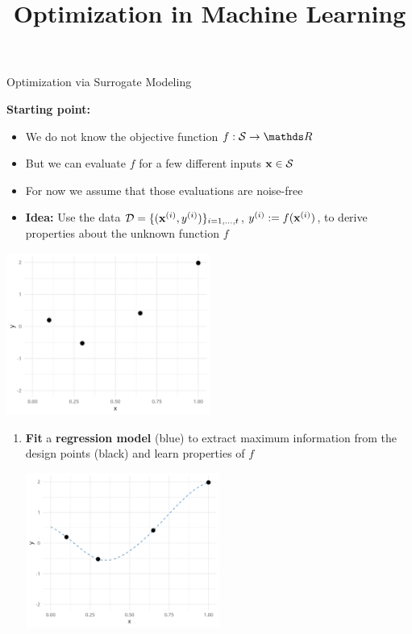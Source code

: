 \documentclass[11pt,compress,t,notes=noshow, xcolor=table]{beamer}
\title{Optimization in Machine Learning}
\date{}
\begin{document}


\begin{vbframe}{Optimization via Surrogate Modeling}

\textbf{Starting point:}
\begin{itemize}
\item We do not know the objective function $f: \mathcal{S} \to \R$
\item But we can evaluate $f$ for a few different inputs $\mathbf{x} \in \mathcal{S}$
\item For now we assume that those evaluations are noise-free

\item \textbf{Idea:}
  Use the data $\mathcal{D} = \{(\mathbf{x}^{(i)}, y^{(i)})\}_{i = 1, \ldots, t}$, $y^{(i)} := f(\mathbf{x}^{(i)})$, to derive properties about the unknown function $f$
\end{itemize}

\begin{center}
  \includegraphics[width = 0.5\textwidth]{figure_man/loop_0.png}
\end{center}

\framebreak 

\begin{enumerate}
\item \textbf{Fit} a \textbf{regression model} (blue) to extract maximum information from the design points (black) and learn properties of $f$
\vspace{+.05cm}

\begin{center}
  \includegraphics[width = 0.5\textwidth]{figure_man/loop_1.png}
\end{center}


\end{enumerate}
\end{vbframe}
\end{document}

